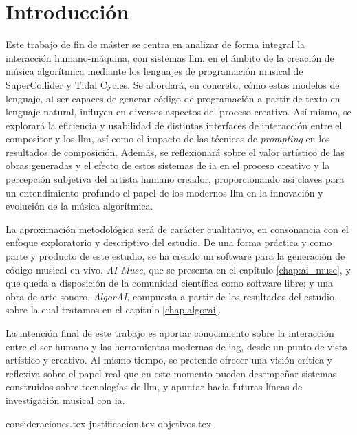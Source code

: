 \chapter{Introducción}



Este trabajo de fin de máster se centra en analizar de forma integral la interacción humano-máquina, con sistemas \gls{llm}, en el ámbito de la creación de música algorítmica mediante los lenguajes de programación musical de SuperCollider y Tidal Cycles. Se abordará, en concreto, cómo estos modelos de lenguaje, al ser capaces de generar código de programación a partir de texto en lenguaje natural, influyen en diversos aspectos del proceso creativo. Así mismo, se explorará la eficiencia y usabilidad de distintas interfaces de interacción entre el compositor y los \gls{llm}, así como el impacto de las técnicas de \emph{prompting} en los resultados de composición. Además, se reflexionará sobre el valor artístico de las obras generadas y el efecto de estos sistemas de \gls{ia} en el proceso creativo y la percepción subjetiva del artista humano creador, proporcionando así claves para un entendimiento profundo el papel de los modernos \gls{llm} en la innovación y evolución de la música algorítmica.

La aproximación metodológica será de carácter cualitativo, en consonancia con el enfoque exploratorio y descriptivo del estudio. De una forma práctica y como parte y producto de este estudio, se ha creado un software para la generación de código musical en vivo, \emph{AI Muse}, que se presenta en el capítulo \ref{chap:ai_muse}, y que queda a disposición de la comunidad científica como software libre; y una obra de arte sonoro, \emph{AlgorAI}, compuesta a partir de los resultados del estudio, sobre la cual tratamos en el capítulo \ref{chap:algorai}.

La intención final de este trabajo es aportar conocimiento sobre la interacción entre el ser humano y las herramientas modernas de \gls{iag}, desde un punto de vista artístico y creativo. Al mismo tiempo, se pretende ofrecer una visión crítica y reflexiva sobre el papel real que en este momento pueden desempeñar sistemas construidos sobre tecnologías de \gls{llm}, y apuntar hacia futuras líneas de investigación musical con \gls{ia}.



{consideraciones.tex}
{justificacion.tex}
{objetivos.tex}